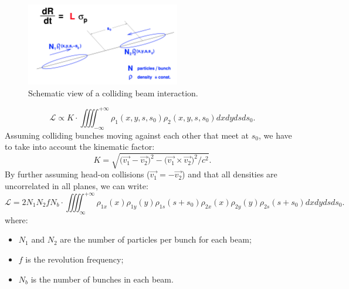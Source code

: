 \begin{figure}
    \centering
    \includegraphics[width=0.6\textwidth]{figures/luminosity_def.png}
    \caption{Schematic view of a colliding beam interaction.}
    \label{fig:lumi-def}
\end{figure}

\begin{equation}
    \mathcal{L} \propto K\cdot\iiiint_{-\infty}^{+\infty}\rho_1(x,y,s,s_0)\rho_2(x,y,s,s_0)dxdydsds_0.\label{lumi_propto}
\end{equation}
Assuming colliding bunches moving against each other that meet at $s_0$, we have to take into account the kinematic factor\cite{Moller}:
\begin{equation}
    K = \sqrt{\bigl(\vec{v_1}-\vec{v_2}\bigr)^2-\bigl(\vec{v_1} \times \vec{v_2}\bigr)^2/c^2}.
\end{equation}
By further assuming head-on collisions ($\vec{v_1}=-\vec{v_2}$) and that all densities are uncorrelated in all planes, we can write:
\begin{equation}
        \mathcal{L} = 2 N_1 N_2 f N_b\cdot\iiiint_{\infty}^{+\infty}\rho_{1x}(x)\rho_{1y}(y)\rho_{1s}(s+s_0)\rho_{2x}(x)\rho_{2y}(y)\rho_{2s}(s+s_0)dxdydsds_0.\label{beam_overlap}
\end{equation}
where:
\begin{itemize}
    \item $ N_1$  and $N_2$  are the number of particles per bunch for each beam;
    \item $f$ is the revolution frequency;
    \item $N_b$  is the number of bunches in each beam.
\end{itemize}

